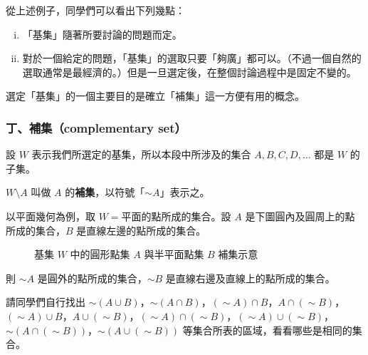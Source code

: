 從上述例子，同學們可以看出下列幾點：
\begin{enumerate}[(i)]
  \item 「基集」隨著所要討論的問題而定。
  \item 對於一個給定的問題，「基集」的選取只要「夠廣」都可以。（不過一個自然的選取通常是最經濟的。）但是一旦選定後，在整個討論過程中是固定不變的。
\end{enumerate}
選定「基集」的一個主要目的是確立「補集」這一方便有用的概念。

\subsubsection*{丁、補集（complementary set）}\label{subsec:2-4-d}

設 $W$ 表示我們所選定的基集，所以本段中所涉及的集合 $A, B, C, D, \dots$ 都是 $W$ 的子集。

\begin{definition}[補集的定義]\label{def:complement}
$W \setminus A$ 叫做 $A$ 的\textbf{補集}，以符號「$\sim A$」表示之。
\end{definition}

\begin{example}\label{ex:2-4-7}
以平面幾何為例，取 $W = \text{平面的點所成的集合}$。設 $A$ 是下圖圓內及圓周上的點所成的集合，$B$ 是直線左邊的點所成的集合。

\begin{figure}[htbp]
\centering
{}
\caption{基集 $W$ 中的圓形點集 $A$ 與半平面點集 $B$ 補集示意}\label{fig:ground_set_complement}
\end{figure}

則 $\sim A$ 是圓外的點所成的集合，$\sim B$ 是直線右邊及直線上的點所成的集合。

請同學們自行找出 $\sim(A \cup B)$，$\sim(A \cap B)$，$(\sim A) \cap B$，$A \cap (\sim B)$，$(\sim A) \cup B$，$A \cup (\sim B)$，$(\sim A) \cap (\sim B)$，$(\sim A) \cup (\sim B)$，$\sim(A \cap (\sim B))$，$\sim(A \cup (\sim B))$ 等集合所表的區域，看看哪些是相同的集合。
\end{example}

